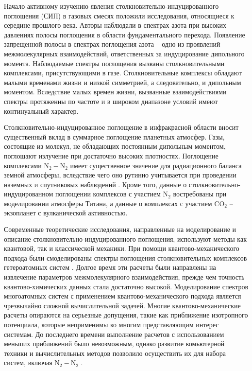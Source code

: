 Начало активному изучению явления столкновительно-индуцированного поглощения (СИП) в газовых смесях положили исследования, относящиеся к середине прошлого века. Авторы \cite{crawford1949} наблюдали в спектрах азота при высоких давлениях полосы поглощения в области фундаментального перехода. Появление запрещенной полосы в спектрах поглощения азота -- одно из проявлений межмолекулярных взаимодействий, ответственных за индуцирование дипольного момента. Наблюдаемые спектры поглощения вызваны столкновительными комплексами, присутствующими в газе. Столкновительные комплексы обладают малыми временами жизни и низкой симметрией, а следовательно, и дипольным моментом. Вследствие малых времен жизни, вызванные взаимодействиями спектры протяженны по частоте и в широком диапазоне условий имеют континуальный характер. \par 
Столкновительно-индуцированное поглощение в инфракрасной области вносит существенный вклад в суммарное поглощение планетных атмосфер. Газы, состоящие из молекул, не обладающих постоянным дипольным моментом, поглощают излучение при достаточно высоких плотностях. Поглощение комплексами N$_2-$N$_2$ имеет существенное значение для радиационного баланса земной атмосферы, вследствие чего оно рутинно учитывается при проведении наземных и спутниковых наблюдений \cite{sioris2014}. Кроме того, данные о столкновительно-индуцированном поглощении комплексов с участием N$_2$ востребованы при моделировании атмосферы Титана, а данные о комплексах с участием CO$_2$ -- экзопланет с вулканической активностью. \par
Современные теоретические исследования, направленные на моделирование и описание столкновительно-индуцированного поглощения, используют методы как квантовой, так и классической механики. При помощи квантово-механического подхода были смоделированы спектры поглощения столкновительных комплексов гетероатомных систем \cite{sharma1975, meyer1986}. Долгое время эти расчеты были направлены на извлечение параметров межмолекулярного взаимодействия, прежде чем точность квантово-химических данных стала достаточно высокой. Моделирование спектров многоатомных систем с применением квантово-механического подхода является чрезвычайно сложной вычислительной задачей. Многие квантово-механические расчеты опираются на серьезные допущения, такие как приближение изотропного потенциала, которые неприменимы ко многим представляющим интерес системам. До последнего времени выполнение расчетов с использованием меньших приближений было невозможным, однако развитие комьютерной техники и вычислительных методов позволило осуществить их для набора систем, включая N$_2-$N$_2$ \cite{karman2015}. \par
